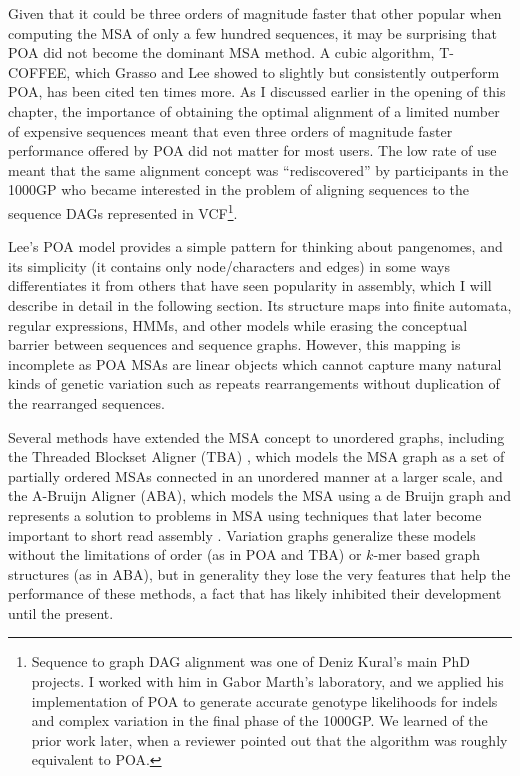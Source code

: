 Given that it could be three orders of magnitude faster that other popular when computing the MSA of only a few hundred sequences, it may be surprising that POA did not become the dominant MSA method.
A cubic algorithm, T-COFFEE, which Grasso and Lee showed to slightly but consistently outperform POA, has been cited ten times more.
As I discussed earlier in the opening of this chapter, the importance of obtaining the optimal alignment of a limited number of expensive sequences meant that even three orders of magnitude faster performance offered by POA did not matter for most users.
The low rate of use meant that the same alignment concept was ``rediscovered'' by participants in the 1000GP who became interested in the problem of aligning sequences to the sequence DAGs represented in VCF\footnote{Sequence to graph DAG alignment was one of Deniz Kural's main PhD projects. I worked with him in Gabor Marth's laboratory, and we applied his implementation of POA to generate accurate genotype likelihoods for indels and complex variation in the final phase of the 1000GP. We learned of the prior work later, when a reviewer pointed out that the algorithm was roughly equivalent to POA.}.

Lee's POA model provides a simple pattern for thinking about pangenomes, and its simplicity (it contains only node/characters and edges) in some ways differentiates it from others that have seen popularity in assembly, which I will describe in detail in the following section.
Its structure maps into finite automata, regular expressions, HMMs, and other models while erasing the conceptual barrier between sequences and sequence graphs.
However, this mapping is incomplete as POA MSAs are linear objects which cannot capture many natural kinds of genetic variation such as repeats rearrangements without duplication of the rearranged sequences.

Several methods have extended the MSA concept to unordered graphs, including the Threaded Blockset Aligner (TBA) \cite{blanchette2004aligning}, which models the MSA graph as a set of partially ordered MSAs connected in an unordered manner at a larger scale, and the A-Bruijn Aligner (ABA), which models the MSA using a de Bruijn graph and represents a solution to problems in MSA using techniques that later become important to short read assembly \cite{raphael2004novel}.
Variation graphs generalize these models without the limitations of order (as in POA and TBA) or $k$-mer based graph structures (as in ABA), but in generality they lose the very features that help the performance of these methods, a fact that has likely inhibited their development until the present.


